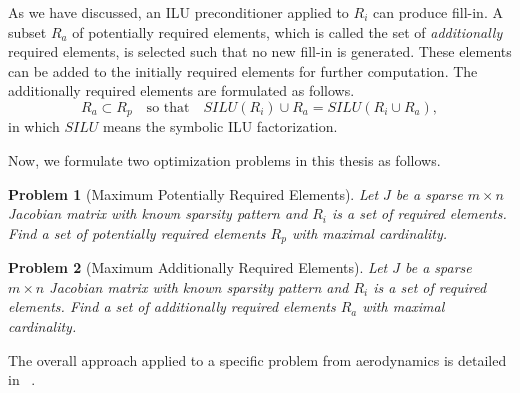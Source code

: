 \documentclass[12pt, twoside,a4paper,toc=bibliography]{scrbook}
\newtheorem{problem}{Problem}
\begin{document}
As we have discussed, an ILU preconditioner applied to $R_i$ can produce fill-in.
A subset $R_a$ of potentially required elements,
which is called the set of \textit{additionally} required elements,
is selected such that no new fill-in is generated.
These elements can be added to the
initially required elements for further computation.
The additionally required elements are formulated as follows.
$$
R_a \subset R_p \quad\text{so that}\quad SILU(R_i) \cup R_a = SILU(R_i\cup R_a),
$$
in which $SILU$ means the symbolic ILU factorization.

Now, we formulate two optimization problems in this thesis as follows.
\begin{problem}[Maximum Potentially Required Elements]
\label{p:max_pot}
%
Let $J$ be a sparse $m\times n$ Jacobian matrix with known sparsity pattern and
$R_i$ is a set of required elements.
Find a set of potentially required elements $R_p$ with maximal cardinality.
\end{problem}

\begin{problem}[Maximum Additionally Required Elements]
\label{p:max_add}
%
Let $J$ be a sparse $m\times n$ Jacobian matrix with known sparsity pattern and
$R_i$ is a set of required elements.
Find a set of additionally required elements $R_a$ with maximal cardinality.
\end{problem}
The overall approach applied to a specific problem from aerodynamics is detailed in
~\cite{cscpaper}.
\end{document}
